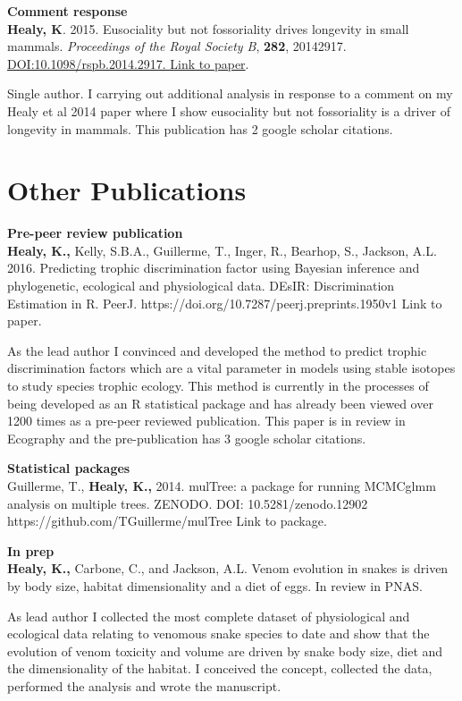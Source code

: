 \documentclass[10pt,a4paper]{article}
\begin{document}
\begin{flushleft}
\textbf{Comment response}\\
\setlength{\parindent}{0mm}\textbf{Healy, K}. 2015.  Eusociality but not fossoriality drives longevity in small mammals. \textit{Proceedings of the Royal Society B}, \textbf{282}, 20142917. \href{http://rspb.royalsocietypublishing.org/content/282/1806/20142917} {DOI:10.1098/rspb.2014.2917. Link to paper}. 
\smallskip
\par{\fontsize{10.5}{10} Single author. I carrying out additional analysis in response to a comment on my Healy et al 2014 paper where I show eusociality but not fossoriality is a driver of longevity in mammals. This publication has 2 google scholar citations.}

\bigskip

\section{Other Publications}
\textbf{Pre-peer review publication}\\
\setlength{\parindent}{0mm}\textbf{Healy, K.,} Kelly, S.B.A., Guillerme, T., Inger, R., Bearhop, S., Jackson, A.L. 2016. Predicting trophic discrimination factor using Bayesian inference and phylogenetic, ecological and physiological data. DEsIR: Discrimination Estimation in R. PeerJ. {https://doi.org/10.7287/peerj.preprints.1950v1 Link to paper}.
\smallskip
\par{\fontsize{10.5}{10} As the lead author I convinced and developed the method to predict trophic discrimination factors which are a vital parameter in models using stable isotopes to study species trophic ecology. This method is currently in the processes of being developed as an R statistical package and has already been viewed over 1200 times as a pre-peer reviewed publication. This paper is in review in Ecography and the pre-publication has 3 google scholar citations.}

\textbf{Statistical packages}\\
\setlength{\parindent}{0mm} Guillerme, T., \textbf{Healy, K.,} 2014. mulTree: a package for running MCMCglmm analysis on multiple trees. ZENODO. DOI: 10.5281/zenodo.12902 {https://github.com/TGuillerme/mulTree Link to package}.


\bigskip

\textbf{In prep}\\

\setlength{\parindent}{0mm}\textbf{Healy, K.,} Carbone, C., and Jackson, A.L. Venom evolution in snakes is driven by body size, habitat dimensionality and a diet of eggs. In review in PNAS.
\smallskip
\par{\fontsize{10.5}{10} As lead author I collected the most complete dataset of physiological and ecological data relating to venomous snake species to date and show that the evolution of venom toxicity and volume are driven by snake body size, diet and the dimensionality of the habitat. I conceived the concept, collected the data, performed the analysis and wrote the manuscript.}
\smallskip


\end{flushleft}
\end{document}
